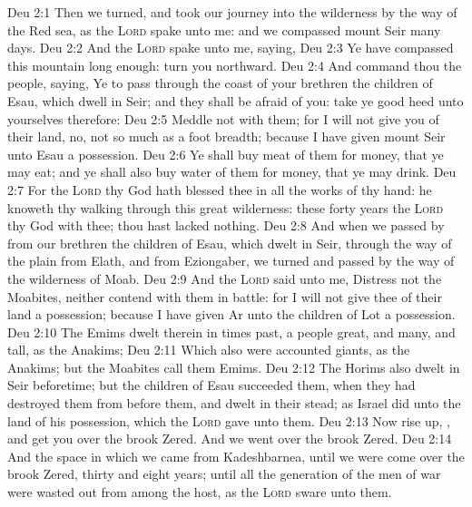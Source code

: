 \vs Deu 2:1 Then we turned, and took our journey into the wilderness by the way of the Red sea, as the \textsc{Lord} spake unto me: and we compassed mount Seir many days.
\vs Deu 2:2 And the \textsc{Lord} spake unto me, saying,
\vs Deu 2:3 Ye have compassed this mountain long enough: turn you northward.
\vs Deu 2:4 And command thou the people, saying, Ye  to pass through the coast of your brethren the children of Esau, which dwell in Seir; and they shall be afraid of you: take ye good heed unto yourselves therefore:
\vs Deu 2:5 Meddle not with them; for I will not give you of their land, no, not so much as a foot breadth; because I have given mount Seir unto Esau  a possession.
\vs Deu 2:6 Ye shall buy meat of them for money, that ye may eat; and ye shall also buy water of them for money, that ye may drink.
\vs Deu 2:7 For the \textsc{Lord} thy God hath blessed thee in all the works of thy hand: he knoweth thy walking through this great wilderness: these forty years the \textsc{Lord} thy God  with thee; thou hast lacked nothing.
\vs Deu 2:8 And when we passed by from our brethren the children of Esau, which dwelt in Seir, through the way of the plain from Elath, and from Eziongaber, we turned and passed by the way of the wilderness of Moab.
\vs Deu 2:9 And the \textsc{Lord} said unto me, Distress not the Moabites, neither contend with them in battle: for I will not give thee of their land  a possession; because I have given Ar unto the children of Lot  a possession.
\vs Deu 2:10 The Emims dwelt therein in times past, a people great, and many, and tall, as the Anakims;
\vs Deu 2:11 Which also were accounted giants, as the Anakims; but the Moabites call them Emims.
\vs Deu 2:12 The Horims also dwelt in Seir beforetime; but the children of Esau succeeded them, when they had destroyed them from before them, and dwelt in their stead; as Israel did unto the land of his possession, which the \textsc{Lord} gave unto them.
\vs Deu 2:13 Now rise up, , and get you over the brook Zered. And we went over the brook Zered.
\vs Deu 2:14 And the space in which we came from Kadeshbarnea, until we were come over the brook Zered,  thirty and eight years; until all the generation of the men of war were wasted out from among the host, as the \textsc{Lord} sware unto them.
